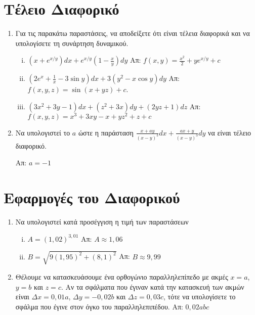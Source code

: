 \section*{Τέλειο Διαφορικό}
\begin{enumerate}
  \item Για τις παρακάτω παραστάσεις, να αποδείξετε ότι είναι τέλεια διαφορικά και 
    να υπολογίσετε τη συνάρτηση δυναμικού.
    \begin{enumerate}[i)]
      \item $ \left(x+e^{x/y}\right)dx + e^{x/y}\left(1- \frac{x}{y}\right)dy $
        \hfill Απ: $ f(x,y) = \frac{x^{2}}{2} +y e^{x/y} + c $ 

      \item $\left(2e^{x}+\frac{1}{x}-3\sin y\right)dx+3(y^2-x\cos y)dy$ 
        \hfill  Απ: $ f(x,y,z) = \sin{(x+yz)} +c $.
      \item $ (3x^{2}+3y-1)dx + (z^{2}+3x)dy+(2yz+1)dz $
        \hfill Απ: $ f(x,y,z) = x^{3}+3xy-x+yz^{2}+z+c $

    \end{enumerate}

  \item Να υπολογιστεί το $a$ ώστε η παράσταση $ \frac{ x + ay }{ (x-y)^{3} }dx 
    + \frac{ ax+y }{ (x-y)^{3} }dy $ να είναι τέλειο διαφορικό.

    \hfill Απ: $ a=-1 $

\end{enumerate}

\section*{Εφαρμογές του Διαφορικού}

\begin{enumerate}
  \item Να υπολογιστεί κατά προσέγγιση η τιμή των παραστάσεων
    \begin{enumerate}[i)]
      \item $A = (1,02)^{3,01} $ \hfill Απ: $ A \approx 1,06 $ 
      \item $B =  \sqrt{ 9(1,95)^{2} + (8,1)^{2} } $ 
        \hfill Απ: $ B \approx 9,99 $ 
    \end{enumerate}

  \item Θέλουμε να κατασκευάσουμε ένα ορθογώνιο παραλληλεπίπεδο με ακμές $ x = a $, 
    $ y=b $ και $ z=c $. Αν τα σφάλματα που έγιναν κατά την κατασκευή των ακμών 
    είναι $ \Delta x = 0,01a $, $ \Delta y = -0,02b $ και $ \Delta z = 0,03c $, 
    τότε να υπολογίσετε το σφάλμα που έγινε στον όγκο του παραλληλεπιπέδου.
    \hfill Απ: $ 0,02abc $ 
\end{enumerate}


